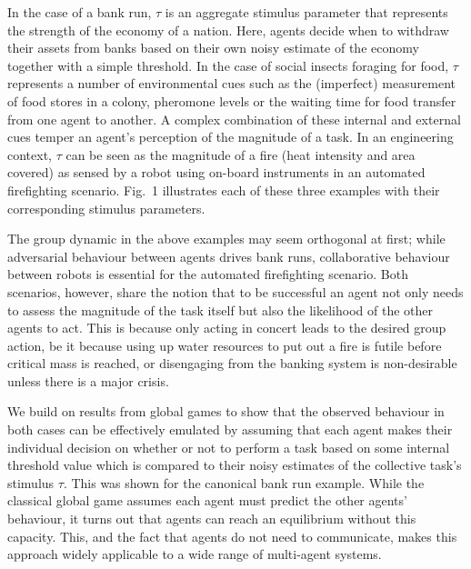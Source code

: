 \documentclass[12pt]{article}
\begin{document}
In the case of a bank run\cite{Morris2000}, $\tau$ is an aggregate stimulus parameter that represents the strength of the economy of a nation. Here, agents decide when to withdraw their assets from banks based on their own noisy estimate of the economy together with a simple threshold. In the case of social insects foraging for food\cite{Bonabeau1996, Theraulaz1998, Krieger2000}, $\tau$ represents a number of environmental cues such as the (imperfect) measurement of food stores in a colony, pheromone levels\cite{Robinson1987} or the waiting time for food transfer from one agent to another\cite{Seeley1989}.  A complex combination of these internal and external cues\cite{Gordon1996} temper an agent's perception of the magnitude of a task. In an engineering context, $\tau$ can be seen as the magnitude of a fire (heat intensity and area covered) as sensed by a robot using on-board instruments in an automated firefighting scenario\cite{Kanakia2014}. Fig.~1 illustrates each of these three examples with their corresponding stimulus parameters. 

The group dynamic in the above examples may seem orthogonal at first; while adversarial behaviour between agents drives bank runs, collaborative behaviour between robots is essential for the automated firefighting scenario. Both scenarios, however, share the notion that to be successful an agent not only needs to assess the magnitude of the task itself but also the likelihood of the other agents to act. This is because only acting in concert leads to the desired group action, be it because using up water resources to put out a fire is futile before critical mass is reached, or disengaging from the banking system is non-desirable unless there is a major crisis. 

We build on results from global games\cite{Carlsson1993} to show that the observed behaviour in both cases can be effectively emulated by assuming that each agent makes their individual decision on whether or not to perform a task based on some internal threshold value which is compared to their noisy estimates of the collective task's stimulus $\tau$. This was shown for the canonical bank run example\cite{Morris2000}. While the classical global game assumes each agent must predict the other agents' behaviour, it turns out that agents can reach an equilibrium without this capacity. This, and the fact that agents do not need to communicate, makes this approach widely applicable to a wide range of multi-agent systems.
\end{document}
